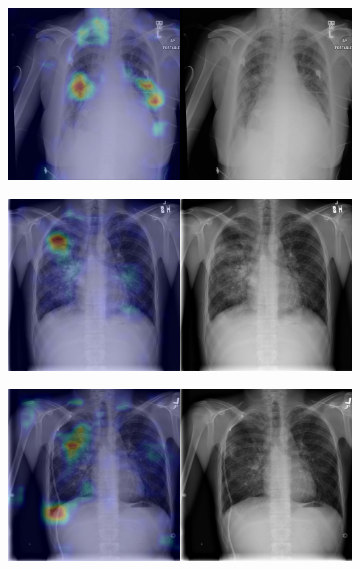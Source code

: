 \begin{figure}[b]
\begin{subfigure}{0.4\textwidth}
    \end{subfigure}
    \begin{subfigure}{0.4\textwidth}
        \centering
        \includegraphics[width=1.0\textwidth]{Chapters/5. Conclusiones/img/Infiltration/1_1_00000211_040.png}
    \end{subfigure}
    \begin{subfigure}{0.4\textwidth}
        \centering
        \includegraphics[width=1.0\textwidth]{Chapters/5. Conclusiones/img/Infiltration/1_1_00001006_014.png}
    \end{subfigure}
    \begin{subfigure}{0.4\textwidth}
        \centering
        \includegraphics[width=1.0\textwidth]{Chapters/5. Conclusiones/img/Infiltration/1_1_00001006_015.png}

\end{subfigure}
\end{figure}
